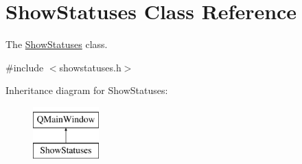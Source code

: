 \hypertarget{class_show_statuses}{}\section{Show\+Statuses Class Reference}
\label{class_show_statuses}


The \mbox{\hyperlink{class_show_statuses}{Show\+Statuses}} class.  




{\ttfamily \#include $<$showstatuses.\+h$>$}

Inheritance diagram for Show\+Statuses\+:\begin{figure}[H]
\begin{center}
\leavevmode
\includegraphics[height=2.000000cm]{class_show_statuses}
\end{center}
\end{figure}
